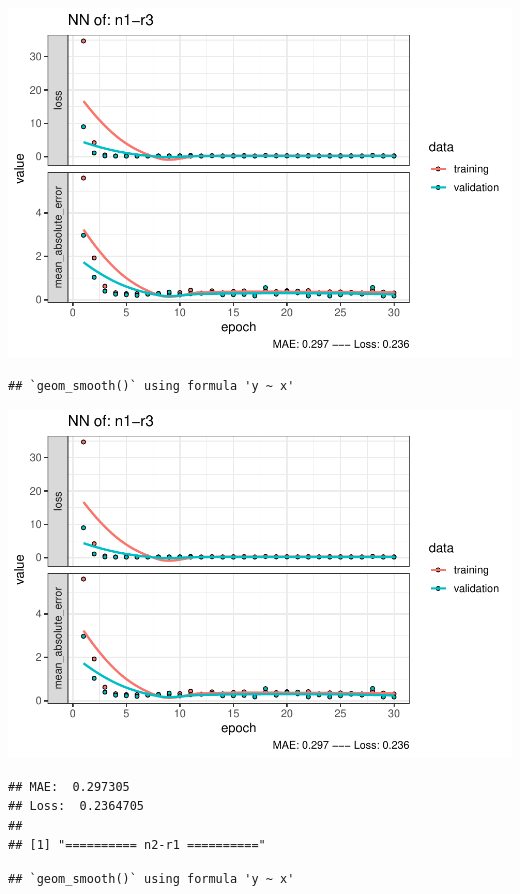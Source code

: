 \documentclass[
]{article}
\begin{document}
\includegraphics{project-code_files/figure-latex/unnamed-chunk-18-15.pdf}

\begin{verbatim}
## `geom_smooth()` using formula 'y ~ x'
\end{verbatim}

\includegraphics{project-code_files/figure-latex/unnamed-chunk-18-16.pdf}

\begin{verbatim}
## MAE:  0.297305
## Loss:  0.2364705 
## 
## [1] "========== n2-r1 =========="
\end{verbatim}

\begin{verbatim}
## `geom_smooth()` using formula 'y ~ x'
\end{verbatim}
\end{document}
